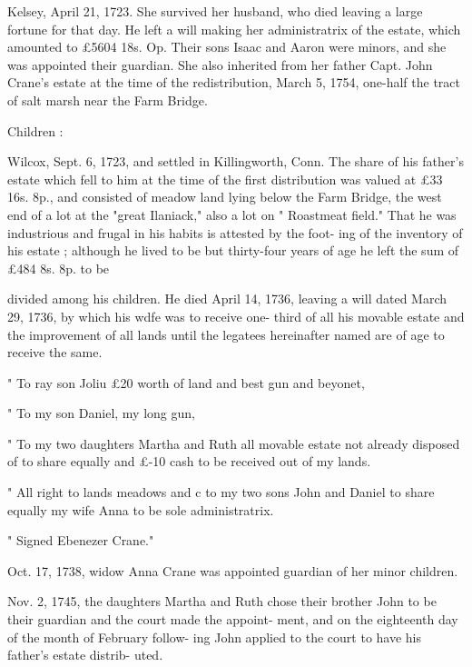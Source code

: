 \documentclass[oneside]{book}
\begin{document}
Kelsey, April 21, 1723. She survived her husband, who died 
leaving a large fortune for that day. He left a will making her 
administratrix of the estate, which amounted to £5604  18s.  Op. 
Their sons Isaac and Aaron were minors, and she was appointed 
their guardian. She also inherited from her father Capt. John 
Crane's estate at the time of the redistribution, March 5, 1754, 
one-half the tract of salt marsh near the Farm Bridge. 

Children : 







Wilcox, Sept. 6, 1723, and settled in Killingworth, Conn. The 
share of his father's estate which fell to him at the time of the 
first distribution was valued at £33  16s.  8p., and consisted of 
meadow land lying below the Farm Bridge, the west end of a lot 
at the "great Ilaniack," also a lot on " Roastmeat field." That 
he was industrious and frugal in his habits is attested by the foot- 
ing of the inventory of his estate ; although he lived to be but 
thirty-four years of age he left the sum of £484  8s.  8p. to be 




divided among his children. He died April 14, 1736, leaving a 
will dated March 29, 1736, by which his wdfe was to receive one- 
third of all his movable estate and the improvement of all lands 
until the legatees hereinafter named are of age to receive the same. 

" To ray son Joliu £20 worth of land and best gun and beyonet, 

" To my son Daniel, my long gun, 

" To my two daughters Martha and Ruth all movable estate not already 
disposed of to share equally and £-10 cash to be received out of my lands. 

" All right to lands meadows and c to my two sons John and Daniel 
to share equally my wife Anna to be sole administratrix. 

" Signed Ebenezer Crane." 

Oct. 17, 1738, widow Anna Crane was appointed guardian of 
her minor children. 

Nov. 2, 1745, the daughters Martha and Ruth chose their 
brother John to be their guardian and the court made the appoint- 
ment, and on the eighteenth day of the month of February follow- 
ing John applied to the court to have his father's estate distrib- 
uted. 
\end{document}
